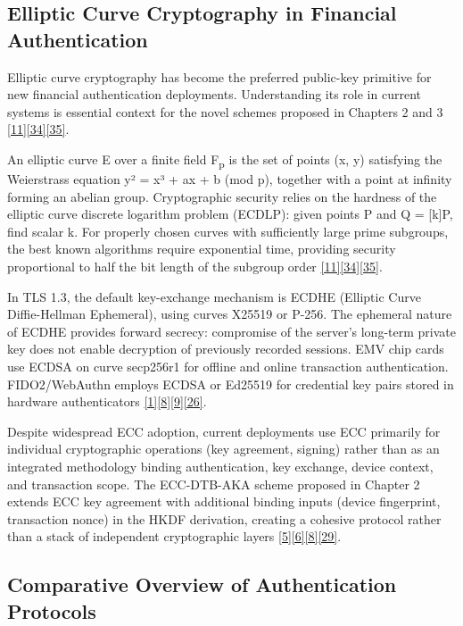 \subsection{Elliptic Curve Cryptography in Financial Authentication}

\indent Elliptic curve cryptography has become the preferred public-key primitive for new financial authentication deployments. Understanding its role in current systems is essential context for the novel schemes proposed in Chapters 2 and 3 \hyperref[ref:11]{[11]}\hyperref[ref:34]{[34]}\hyperref[ref:35]{[35]}.

\indent An elliptic curve E over a finite field F\textsubscript{p} is the set of points (x, y) satisfying the Weierstrass equation y² = x³ + ax + b (mod p), together with a point at infinity forming an abelian group. Cryptographic security relies on the hardness of the elliptic curve discrete logarithm problem (ECDLP): given points P and Q = [k]P, find scalar k. For properly chosen curves with sufficiently large prime subgroups, the best known algorithms require exponential time, providing security proportional to half the bit length of the subgroup order \hyperref[ref:11]{[11]}\hyperref[ref:34]{[34]}\hyperref[ref:35]{[35]}.

\indent In TLS 1.3, the default key-exchange mechanism is ECDHE (Elliptic Curve Diffie-Hellman Ephemeral), using curves X25519 or P-256. The ephemeral nature of ECDHE provides forward secrecy: compromise of the server's long-term private key does not enable decryption of previously recorded sessions. EMV chip cards use ECDSA on curve secp256r1 for offline and online transaction authentication. FIDO2/WebAuthn employs ECDSA or Ed25519 for credential key pairs stored in hardware authenticators \hyperref[ref:1]{[1]}\hyperref[ref:8]{[8]}\hyperref[ref:9]{[9]}\hyperref[ref:26]{[26]}.

\indent Despite widespread ECC adoption, current deployments use ECC primarily for individual cryptographic operations (key agreement, signing) rather than as an integrated methodology binding authentication, key exchange, device context, and transaction scope. The ECC-DTB-AKA scheme proposed in Chapter 2 extends ECC key agreement with additional binding inputs (device fingerprint, transaction nonce) in the HKDF derivation, creating a cohesive protocol rather than a stack of independent cryptographic layers \hyperref[ref:5]{[5]}\hyperref[ref:6]{[6]}\hyperref[ref:8]{[8]}\hyperref[ref:29]{[29]}.

\subsection{Comparative Overview of Authentication Protocols}

